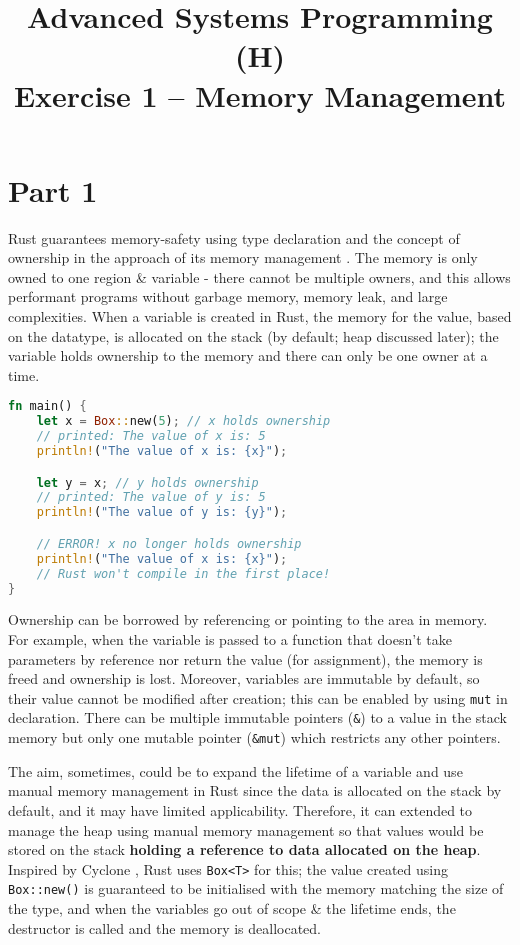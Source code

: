 \documentclass[10pt,a4paper,twocolumn]{article}
\begin{document}
\title{Advanced Systems Programming (H)\\Exercise 1 -- Memory Management}
\author{}

\date{}

\maketitle

\section*{Part 1}\label{sec:part1}

Rust guarantees memory-safety using type declaration and the concept of ownership in the approach of its memory management \cite{WhatisOw63,klabnik2019rust}. The memory is only owned to one region \& variable - there cannot be multiple owners, and this allows performant programs without garbage memory, memory leak, and large complexities. When a variable is created in Rust, the memory for the value, based on the datatype, is allocated on the stack (by default; heap discussed later); the variable holds ownership to the memory and there can only be one owner at a time.

\begin{lstlisting}[language=Rust,caption={Variable declaration \& usage example in Rust}]
fn main() {
    let x = Box::new(5); // x holds ownership
    // printed: The value of x is: 5
    println!("The value of x is: {x}");

    let y = x; // y holds ownership
    // printed: The value of y is: 5
    println!("The value of y is: {y}");

    // ERROR! x no longer holds ownership
    println!("The value of x is: {x}");
    // Rust won't compile in the first place!
}
\end{lstlisting}

Ownership can be borrowed by referencing or pointing to the area in memory. For example, when the variable is passed to a function that doesn't take parameters by reference nor return the value (for assignment), the memory is freed and ownership is lost. Moreover, variables are immutable by default, so their value cannot be modified after creation; this can be enabled by using \texttt{mut} in declaration. There can be multiple immutable pointers (\texttt{\&}) to a value in the stack memory but only one mutable pointer (\texttt{\&mut}) which restricts any other pointers.

The aim, sometimes, could be to expand the lifetime of a variable and use manual memory management in Rust since the data is allocated on the stack by default, and it may have limited applicability. Therefore, it can extended to manage the heap using manual memory management so that values would be stored on the stack \textbf{holding a reference to data allocated on the heap}. Inspired by Cyclone \cite{Influenc17,CycloneI74,10.1145/512529.512563,10.1145/1029873.1029883}, Rust uses \texttt{Box<T>} for this; the value created using \texttt{Box::new()} is guaranteed to be initialised with the memory matching the size of the type, and when the variables go out of scope \& the lifetime ends, the destructor is called and the memory is deallocated.
\end{document}
